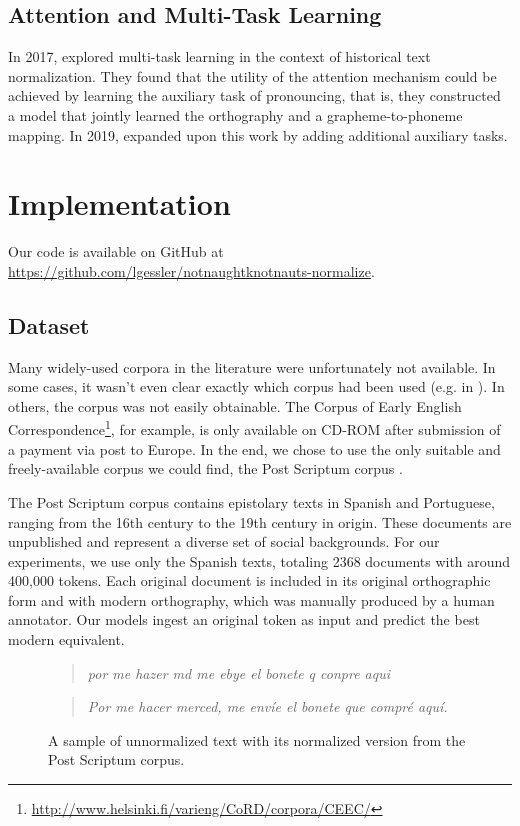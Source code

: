 \documentclass[11pt,a4paper]{article}
\begin{document}
\subsection {Attention and Multi-Task Learning}
In 2017, \citeauthor{bollmann_learning_2017} explored multi-task learning in the context of historical text normalization. They found that the utility of the attention mechanism could be achieved by learning the auxiliary task of pronouncing, that is, they constructed a model that jointly learned the orthography and a grapheme-to-phoneme mapping. In 2019, \citeauthor{bollmann_few-shot_2019} expanded upon this work by adding additional auxiliary tasks.

\section{Implementation}
Our code is available on GitHub at \url{https://github.com/lgessler/notnaughtknotnauts-normalize}.

\subsection{Dataset}
Many widely-used corpora in the literature were unfortunately not available. In some cases, it wasn't even clear exactly which corpus had been used (e.g. in \citet{pettersson_spelling_2016}). In others, the corpus was not easily obtainable. The Corpus of Early English Correspondence\footnote{\url{http://www.helsinki.fi/varieng/CoRD/corpora/CEEC/}}, for example, is only available on CD-ROM after submission of a payment via post to Europe. In the end, we chose to use the only suitable and freely-available corpus we could find, the Post Scriptum corpus \cite{vaamonde_post_2014}. 

The Post Scriptum corpus contains epistolary texts in Spanish and Portuguese, ranging from the 16th century to the 19th century in origin. These documents are unpublished and represent a diverse set of social backgrounds. For our experiments, we use only the Spanish texts, totaling 2368 documents with around 400,000 tokens. Each original document is included in its original orthographic form and with modern orthography, which was manually produced by a human annotator. Our models ingest an original token as input and predict the best modern equivalent.

\begin{figure}[h]
\begin{quotation}
\noindent \textit{por me hazer md me ebye el bonete q conpre aqui}
\end{quotation}
\begin{quote}
\textit{Por me hacer merced, me envíe el bonete que compré aquí.}
\caption{A sample of unnormalized text with its normalized version from the Post Scriptum corpus.}
\end{quote}
\end{figure}
\end{document}
